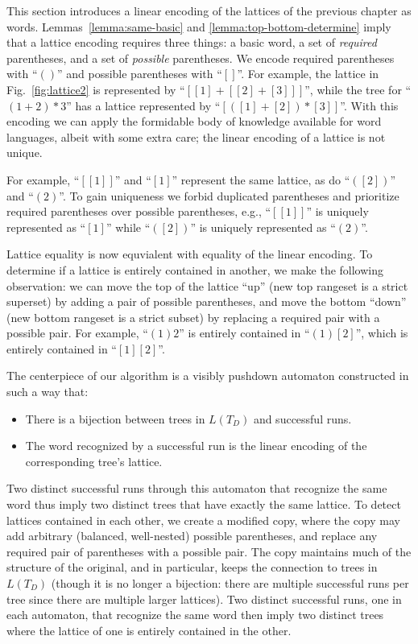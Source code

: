 \documentclass[acmsmall,review,anonymous]{acmart}\settopmatter{printfolios=true,printccs=false,printacmref=false}
\newcommand{\reqpl}{(}
\newcommand{\reqpr}{)}
\newcommand{\reqp}[1]{\reqpl#1\reqpr}
\newcommand{\pospl}{[}
\newcommand{\pospr}{]}
\newcommand{\posp}[1]{\pospl#1\pospr}
\begin{document}
This section introduces a linear encoding of the lattices of the previous chapter as words. Lemmas~\ref{lemma:same-basic} and \ref{lemma:top-bottom-determine} imply that a lattice encoding requires three things: a basic word, a set of \emph{required} parentheses, and a set of \emph{possible} parentheses. We encode required parentheses with ``$\reqp{}$'' and possible parentheses with ``$\posp{}$''. For example, the lattice in Fig.~\ref{fig:lattice2} is represented by ``$\posp{\posp{1} + \posp{\posp{2} + \posp{3}}}$'', while the tree for ``$(1 + 2) * 3$'' has a lattice represented by ``$\posp{\reqp{\posp{1} + \posp{2}} * \posp{3}}$''. With this encoding we can apply the formidable body of knowledge available for word languages, albeit with some extra care; the linear encoding of a lattice is not unique.

For example, ``$\posp{\posp{1}}$'' and ``$\posp{1}$'' represent the same lattice, as do ``$\reqp{\posp{2}}$'' and ``$\reqp{2}$''. To gain uniqueness we forbid duplicated parentheses and prioritize required parentheses over possible parentheses, e.g., ``$\posp{\posp{1}}$'' is uniquely represented as ``$\posp{1}$'' while ``$\reqp{\posp{2}}$'' is uniquely represented as ``$\reqp{2}$''.

Lattice equality is now equvialent with equality of the linear encoding. To determine if a lattice is entirely contained in another, we make the following observation: we can move the top of the lattice ``up'' (new top rangeset is a strict superset) by adding a pair of possible parentheses, and move the bottom ``down'' (new bottom rangeset is a strict subset) by replacing a required pair with a possible pair. For example, ``$\reqp{1}2$'' is entirely contained in ``$\reqp{1}\posp{2}$'', which is entirely contained in ``$\posp{1}\posp{2}$''.

The centerpiece of our algorithm is a visibly pushdown automaton constructed in such a way that:

\begin{itemize}
\item There is a bijection between trees in $L(T_D)$ and successful runs.
\item The word recognized by a successful run is the linear encoding of the corresponding tree's lattice.
\end{itemize}

\noindent Two distinct successful runs through this automaton that recognize the same word thus imply two distinct trees that have exactly the same lattice. To detect lattices contained in each other, we create a modified copy, where the copy may add arbitrary (balanced, well-nested) possible parentheses, and replace any required pair of parentheses with a possible pair. The copy maintains much of the structure of the original, and in particular, keeps the connection to trees in $L(T_D)$ (though it is no longer a bijection: there are multiple successful runs per tree since there are multiple larger lattices). Two distinct successful runs, one in each automaton, that recognize the same word then imply two distinct trees where the lattice of one is entirely contained in the other.
\end{document}
